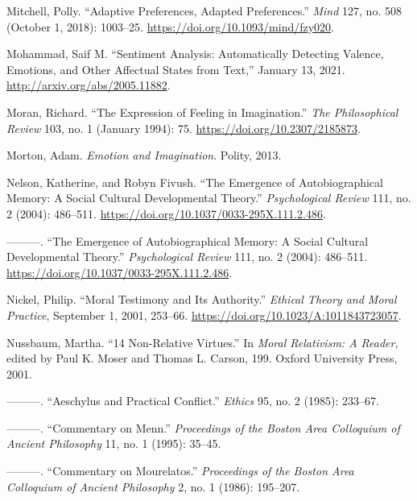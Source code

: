 \documentclass[phdthesis,12pt,final]{wuthesis}
\newlength{\cslhangindent}
\newenvironment{CSLReferences}[2] %
{\begin{list}{}{%
	\setlength{\itemindent}{0pt}
	\setlength{\leftmargin}{0pt}
	\setlength{\parsep}{0pt}
	\ifodd #1
	\setlength{\leftmargin}{\cslhangindent}
	\setlength{\itemindent}{-1\cslhangindent}
	\fi
	\setlength{\itemsep}{#2\baselineskip}}}
{\end{list}}
\theoremstyle{definition}
\theoremstyle{definition}
\theoremstyle{definition}
\theoremstyle{definition}
\theoremstyle{remark}
\begin{document}
\begin{CSLReferences}{1}{0}
Mitchell, Polly. {``Adaptive {Preferences}, {Adapted Preferences}.''} \emph{Mind} 127, no. 508 (October 1, 2018): 1003--25. \url{https://doi.org/10.1093/mind/fzy020}.

Mohammad, Saif M. {``Sentiment {Analysis}: {Automatically Detecting Valence}, {Emotions}, and {Other Affectual States} from {Text},''} January 13, 2021. \url{http://arxiv.org/abs/2005.11882}.

Moran, Richard. {``The {Expression} of {Feeling} in {Imagination}.''} \emph{The Philosophical Review} 103, no. 1 (January 1994): 75. \url{https://doi.org/10.2307/2185873}.

Morton, Adam. \emph{Emotion and {Imagination}}. Polity, 2013.

Nelson, Katherine, and Robyn Fivush. {``The {Emergence} of {Autobiographical Memory}: {A Social Cultural Developmental Theory}.''} \emph{Psychological Review} 111, no. 2 (2004): 486--511. \url{https://doi.org/10.1037/0033-295X.111.2.486}.

---------. {``The {Emergence} of {Autobiographical Memory}: {A Social Cultural Developmental Theory}.''} \emph{Psychological Review} 111, no. 2 (2004): 486--511. \url{https://doi.org/10.1037/0033-295X.111.2.486}.

Nickel, Philip. {``Moral {Testimony} and Its {Authority}.''} \emph{Ethical Theory and Moral Practice}, September 1, 2001, 253--66. \url{https://doi.org/10.1023/A:1011843723057}.

Nussbaum, Martha. {``14 {Non-Relative Virtues}.''} In \emph{Moral {Relativism}: {A Reader}}, edited by Paul K. Moser and Thomas L. Carson, 199. Oxford University Press, 2001.

---------. {``Aeschylus and Practical Conflict.''} \emph{Ethics} 95, no. 2 (1985): 233--67.

---------. {``Commentary on {Menn}.''} \emph{Proceedings of the Boston Area Colloquium of Ancient Philosophy} 11, no. 1 (1995): 35--45.

---------. {``Commentary on {Mourelatos}.''} \emph{Proceedings of the Boston Area Colloquium of Ancient Philosophy} 2, no. 1 (1986): 195--207.


\end{CSLReferences}
\end{document}
